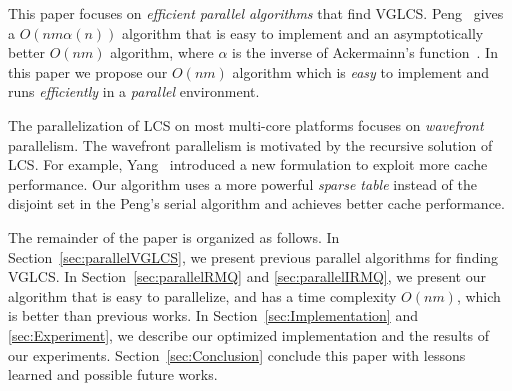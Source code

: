 This paper focuses on {\em efficient parallel algorithms} that find
VGLCS.  Peng~\cite{Peng2011TheLC} gives a $O(nm \alpha(n))$ algorithm
that is easy to implement and an asymptotically better $O(nm)$
algorithm, where $\alpha$ is the inverse of Ackermainn's
function~\cite{Banachowski1980ACT}.  In this paper we propose our
$O(nm)$ algorithm which is {\em easy} to implement and runs {\em
  efficiently} in a {\em parallel} environment.


The parallelization of LCS on most multi-core platforms focuses on
{\em wavefront} parallelism.  The wavefront parallelism is motivated
by the recursive solution of LCS.  For example,
Yang~\cite{Yang2010AnEP} introduced a new formulation to exploit more
cache performance.  Our algorithm uses a more powerful {\em sparse
  table} instead of the disjoint set in the Peng's serial algorithm
and achieves better cache performance.


\iffalse 在約束條件下的 LCS 中，如 \emph{fixed gap LCS } (FGLCS)要求任
兩個挑選的距離在相對應的另一個字串中相等，同時距離最大為 $k+1$，可在時
間複雜度在 $O(nm)$ 內解決，其中 $n$, $m$ 分別為兩個輸入的字串長度。我
們將在這篇論文針對 \emph{variable gap LCS} (VGLCS) 進行探討。在 VGLCS
中，對各個不同的位置提供約束限制，如目前給定兩個字串 $A =
\tt{GCGCAATG}$, $B = \tt{GCCCTAGCG}$，各自的約束限制為 $G_A = [3, 1,
  1, 2, 0, 0, 2, 1]$ 和 $G_B = [2, 0, 3, 2, 0, 1, 2, 0, 1]$，其中
$G_A(i)$ 表示當挑選第 $i$ 個位置時，與前一個挑選的位置最多差
$G_A(i)+1$，同理 $G_B(i)$；我們可以得到兩組 VGLCS 的解
$\tt{G..C..C..A}$ 和 $\tt{G..C..C..T}$，挑選的方式如圖
~\ref{fig:VGLCSex}。在 Yung-Hsing Peng ~\cite{yunghsing} 的論文已對
VGLCS 提出易於實作的 $O(nm \alpha(n))$ 和理論 $O(nm)$ 的解法。\fi


The remainder of the paper is organized as follows.  In
Section~\ref{sec:parallelVGLCS}, we present previous parallel
algorithms for finding VGLCS.  In Section~\ref{sec:parallelRMQ} and
\ref{sec:parallelIRMQ}, we present our algorithm that is easy to
parallelize, and has a time complexity $O(nm)$, which is better than
previous works.  In Section~\ref{sec:Implementation} and
\ref{sec:Experiment}, we describe our optimized implementation and the
results of our experiments.  Section~\ref{sec:Conclusion} conclude
this paper with lessons learned and possible future works.

\iffalse 這一篇論文，我們將在第二 \ref{sec:parallelVGLCS} 節部分將
Yung-Hsing Peng ~\cite{yunghsing} 提出的算法進行平行化。在第三節
~\ref{sec:parallelRMQ}，在理論分析上提供易平行且時間複雜度 $O(nm)$ 的
設計。在第四節 ~\ref{sec:Implementation}，我們將藉由快取忘卻
(cache-oblivious) 技術，在實作上提供更好的效能。最後，我們總結實驗結果
與理論實務上的差異。\fi

